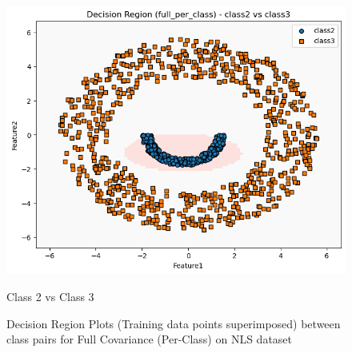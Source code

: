 \begin{figure}[H]
    \hfill
    \begin{minipage}{0.32\linewidth}
        \includegraphics[width=\linewidth]{images/NLS_Group04_images/04_full_per_class/04_decision_region_c2_c3.png}
        \caption*{Class 2 vs Class 3}
    \end{minipage}
    \caption{Decision Region Plots (Training data points superimposed) between class pairs for Full Covariance (Per-Class) on NLS dataset}
\end{figure}